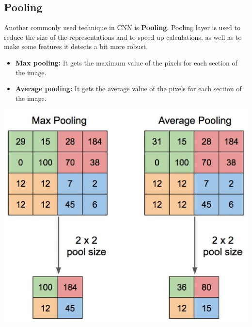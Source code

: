 \subsection{Pooling}
Another commonly used technique in CNN is \textbf{Pooling}.\newline\newline
Pooling layer is used to reduce the size of the representations and to speed up calculations, as well as to make some features it detects a bit more robust.
\begin{itemize}
    \item \textbf{Max pooling:} It gets the maximum value of the pixels for each section of the image.

    \item \textbf{Average pooling:} It gets the average value of the pixels for each section of the image.
\end{itemize}
\begin{center}
    \includegraphics[scale = 0.3]{images/pooling.png}
\end{center}

